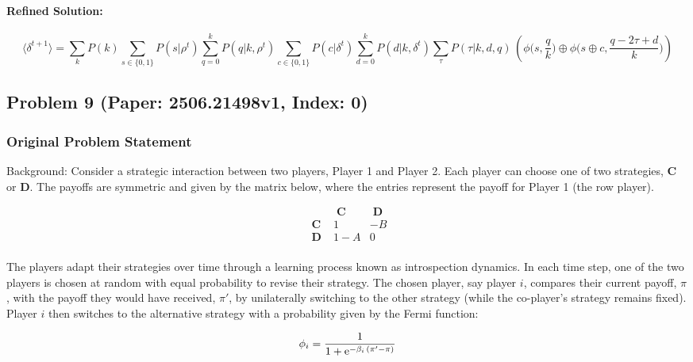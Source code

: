 \documentclass[10pt]{article}
\begin{document}
\paragraph*{Refined Solution:}
\[ \langle\delta^{t+1}\rangle = \sum_k P(k)\!\! \sum_{s \in \{0,1\}}\!\!\! P(s|\rho^t)
                \sum_{q=0}^k P(q|k,\rho^t)\!\! \sum_{c \in \{0,1\}}P(c|\delta^t)
                \sum_{d=0}^k P(d|k, \delta^t)
                \sum_{\tau} P(\tau|k,d,q) \, \left( \phi\bigg(s, \frac{q}{k}\bigg) \oplus \phi\bigg(s\oplus c, \frac{q-2\tau+d}{k}\bigg) \right) \]

\newpage
\subsection*{Problem 9 (Paper: 2506.21498v1, Index: 0)}

\subsubsection*{Original Problem Statement}
Background:
Consider a strategic interaction between two players, Player 1 and Player 2. Each player can choose one of two strategies, $\mathbf{C}$ or $\mathbf{D}$. The payoffs are symmetric and given by the matrix below, where the entries represent the payoff for Player 1 (the row player).

\begin{equation*}
	\begin{array}{c|cc}
		&\mathbf{\;C\;} &\mathbf{\;D\;}\\
		\hline
		\mathbf{\;C\;} &1 &-B \\
		\mathbf{\;D\;} &1-A &0 \\
	\end{array}
\end{equation*}

The players adapt their strategies over time through a learning process known as introspection dynamics. In each time step, one of the two players is chosen at random with equal probability to revise their strategy. The chosen player, say player $i$, compares their current payoff, $\pi$, with the payoff they would have received, $\pi'$, by unilaterally switching to the other strategy (while the co-player's strategy remains fixed). Player $i$ then switches to the alternative strategy with a probability given by the Fermi function:

\begin{equation*}
	\phi_i = \frac{1}{1+{\rm e}^{-\beta_i\, (\pi' - \pi)}}
\end{equation*}
\end{document}
